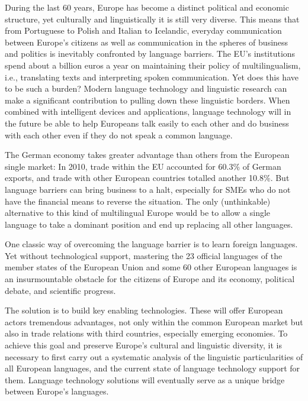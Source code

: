 \cleardoublepage




\begin{multicols}{2}
    
    During the last 60 years, Europe has become a distinct political and economic structure, yet culturally and linguistically it is still very diverse. This means that from Portuguese to Polish and Italian to Icelandic, everyday communication between Europe’s citizens as well as communication in the spheres of business and politics is inevitably confronted by language barriers. The EU’s institutions spend about a billion euros a year on maintaining their policy of multilingualism, i.e., translating texts and interpreting spoken communication. Yet does this have to be such a burden? Modern language technology and linguistic research can make a significant contribution to pulling down these linguistic borders. When combined with intelligent devices and applications, language technology will in the future be able to help Europeans talk easily to each other and do business with each other even if they do not speak a common language. 

    
    The German economy takes greater advantage than others from the European single market: In 2010, trade within the EU accounted for 60.3\% of German exports, and trade with other European countries totalled another 10.8\%. But language barriers can bring business to a halt, especially for SMEs who do not have the financial means to reverse the situation. The only (unthinkable) alternative to this kind of multilingual Europe would be to allow a single language to take a dominant position and end up replacing all other languages. 

    One classic way of overcoming the language barrier is to learn foreign languages. Yet without technological support, mastering the 23 official languages of the member states of the European Union and some 60 other European languages is an insurmountable obstacle for the citizens of Europe and its economy, political debate, and scientific progress. 

    The solution is to build key enabling technologies. These will offer European actors tremendous advantages, not only within the common European market but also in trade relations with third countries, especially emerging economies. To achieve this goal and preserve Europe’s cultural and linguistic diversity, it is necessary to first carry out a systematic analysis of the linguistic particularities of all European languages, and the current state of language technology support for them. Language technology solutions will eventually serve as a unique bridge between Europe’s languages. 


\end{multicols}
